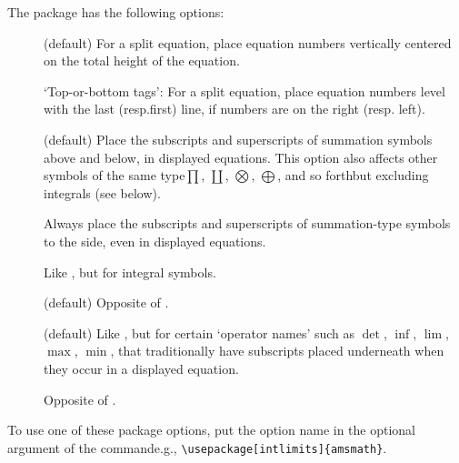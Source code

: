 \documentclass[leqno,titlepage,openany]{amsldoc}[1999/12/13]
\begin{document}
The  package has the following options:
\begin{description}

\item[] (default) For a split equation, place equation
numbers vertically centered
on the total height of the equation.

\item[] `Top-or-bottom tags': For a split equation, place
equation numbers level with
the last (resp.\@ first) line, if numbers are on the right (resp.\@
left).

\item[] (default) Place the subscripts and
superscripts\relax
{} of summation symbols
above and below, in displayed equations. This option also affects other
symbols of the same type\mdash $\prod$, $\coprod$, $\bigotimes$,
$\bigoplus$, and so forth\mdash but excluding integrals (see below).

\item[] Always place the subscripts and superscripts of
summation-type symbols to the side, even in displayed equations.

\item[] Like , but for
integral symbols.

\item[] (default) Opposite of .

\item[] (default) Like , but for certain
`operator names' such as $\det$, $\inf$, $\lim$, $\max$, $\min$, that
traditionally have subscripts  placed underneath when they occur in a displayed
equation.

\item[] Opposite of .

\end{description}

To use one of these package options, put the option name in the optional
argument of the  command\mdash e.g.,
\verb"\usepackage[intlimits]{amsmath}".
\end{document}
